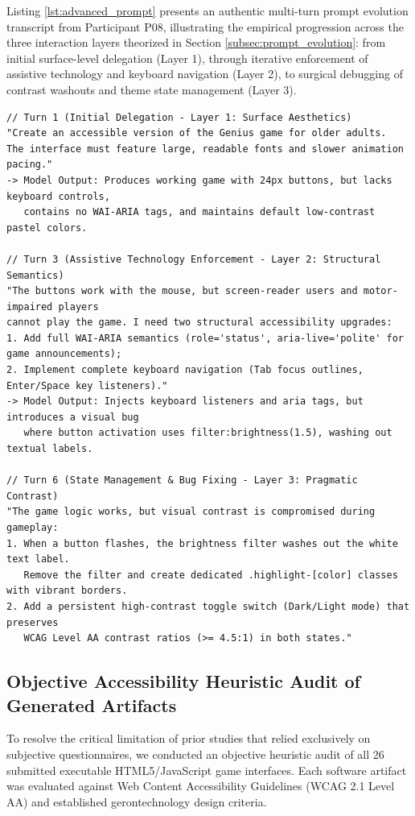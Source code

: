 \documentclass{cleiej}
\begin{document}
Listing \ref{lst:advanced_prompt} presents an authentic multi-turn prompt evolution transcript from Participant P08, illustrating the empirical progression across the three interaction layers theorized in Section \ref{subsec:prompt_evolution}: from initial surface-level delegation (Layer 1), through iterative enforcement of assistive technology and keyboard navigation (Layer 2), to surgical debugging of contrast washouts and theme state management (Layer 3).

\begin{lstlisting}[caption={Representative Multi-Turn Prompt Evolution Transcript Across Interaction Layers (Participant P08, translated from Portuguese).}, label={lst:advanced_prompt}]
// Turn 1 (Initial Delegation - Layer 1: Surface Aesthetics)
"Create an accessible version of the Genius game for older adults.
The interface must feature large, readable fonts and slower animation pacing."
-> Model Output: Produces working game with 24px buttons, but lacks keyboard controls,
   contains no WAI-ARIA tags, and maintains default low-contrast pastel colors.

// Turn 3 (Assistive Technology Enforcement - Layer 2: Structural Semantics)
"The buttons work with the mouse, but screen-reader users and motor-impaired players
cannot play the game. I need two structural accessibility upgrades:
1. Add full WAI-ARIA semantics (role='status', aria-live='polite' for game announcements);
2. Implement complete keyboard navigation (Tab focus outlines, Enter/Space key listeners)."
-> Model Output: Injects keyboard listeners and aria tags, but introduces a visual bug
   where button activation uses filter:brightness(1.5), washing out textual labels.

// Turn 6 (State Management & Bug Fixing - Layer 3: Pragmatic Contrast)
"The game logic works, but visual contrast is compromised during gameplay:
1. When a button flashes, the brightness filter washes out the white text label.
   Remove the filter and create dedicated .highlight-[color] classes with vibrant borders.
2. Add a persistent high-contrast toggle switch (Dark/Light mode) that preserves
   WCAG Level AA contrast ratios (>= 4.5:1) in both states."
\end{lstlisting}

\FloatBarrier
\subsection{Objective Accessibility Heuristic Audit of Generated Artifacts}
To resolve the critical limitation of prior studies that relied exclusively on subjective questionnaires, we conducted an objective heuristic audit of all 26 submitted executable HTML5/JavaScript game interfaces. Each software artifact was evaluated against Web Content Accessibility Guidelines (WCAG 2.1 Level AA) and established gerontechnology design criteria.
\end{document}
